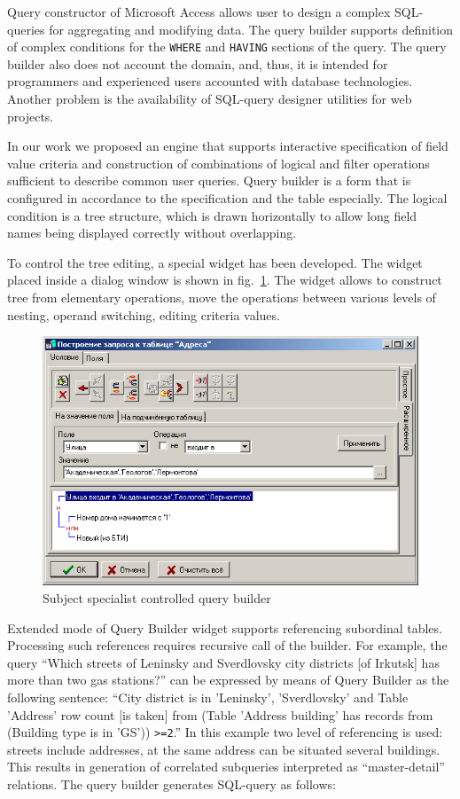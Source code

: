 \documentclass[conference]{IEEEtran}
\begin{document}
Query constructor of Microsoft Access allows user to design a complex SQL-queries for aggregating and modifying data.  The query builder supports definition of complex conditions for the \texttt{WHERE} and \texttt{HAVING} sections of the query.  The query builder also does not account the domain, and, thus, it is intended for programmers and experienced users accounted with database technologies.  Another problem is the availability of SQL-query designer utilities for web projects.

In our work we proposed an engine that supports interactive specification of field value criteria and construction of combinations of logical and filter operations sufficient to describe common user queries.  Query builder is a form that is configured in accordance to the specification and the table especially.  The logical condition is a tree structure, which is drawn horizontally to allow long field names being displayed correctly without overlapping.

To control the tree editing, a special widget has been developed.  The widget placed inside a dialog window is shown in fig.~\ref{fig:qbuilder}.  The widget allows to construct tree from elementary operations, move the operations between various levels of nesting, operand switching, editing criteria values.

\begin{figure}[t]
  \centering
  \includegraphics[width=\linewidth]{qbuilder.png}
  \caption{Subject specialist controlled query builder}
  \label{fig:qbuilder}
\end{figure}

Extended mode of Query Builder widget supports referencing subordinal tables.  Processing such references requires recursive call of the builder.  For example, the query ``Which streets of Leninsky and Sverdlovsky city districts [of Irkutsk] has more than two gas stations?'' can be expressed by means of Query Builder as the following sentence: ``City district is in 'Leninsky', 'Sverdlovsky' and Table 'Address' row count [is taken] from (Table 'Address building' has records from (Building type is in 'GS')) \verb|>=2|.''  In this example two level of referencing is used: streets include addresses, at the same address can be situated several buildings.  This results in generation of correlated subqueries interpreted as ``master-detail'' relations.  The query builder generates SQL-query as follows:
\end{document}

